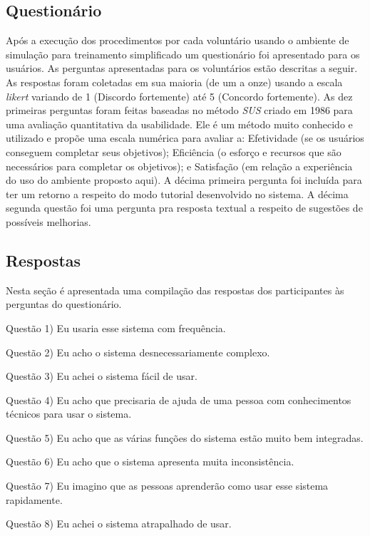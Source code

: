 \subsection{Questionário}
\label{sec:questionarioUsabilidade}

Após a execução dos procedimentos por cada voluntário usando o ambiente de simulação para treinamento simplificado um questionário foi apresentado para os usuários. As perguntas apresentadas para os voluntários estão descritas a seguir. As respostas foram coletadas em sua maioria (de um a onze) usando a escala \textit{likert} \cite{Norman2010} variando de 1 (Discordo fortemente) até 5 (Concordo fortemente). As dez primeiras perguntas foram feitas baseadas no método \textit{\acrfull{SUS}} \cite{Brooke2013} criado em 1986 para uma avaliação quantitativa da usabilidade. Ele é um método muito conhecido e utilizado e propõe uma escala numérica para avaliar a: Efetividade (se os usuários conseguem completar seus objetivos); 
Eficiência (o esforço e recursos que são necessários para completar os objetivos); e
Satisfação (em relação a experiência do uso do ambiente proposto aqui). A décima primeira pergunta foi incluída para ter um retorno a respeito do modo tutorial desenvolvido no sistema. A décima segunda questão foi uma pergunta pra resposta textual a respeito de sugestões de possíveis melhorias.

\subsection{Respostas}
\label{sec:respostasUsabilidade}

Nesta seção é apresentada uma compilação das respostas dos participantes às perguntas do questionário.

Questão 1) Eu usaria esse sistema com frequência.

Questão 2) Eu acho o sistema desnecessariamente complexo.

Questão 3) Eu achei o sistema fácil de usar.

Questão 4) Eu acho que precisaria de ajuda de uma pessoa com conhecimentos técnicos para usar o sistema.

Questão 5) Eu acho que as várias funções do sistema estão muito bem integradas.

Questão 6) Eu acho que o sistema apresenta muita inconsistência.

Questão 7) Eu imagino que as pessoas aprenderão como usar esse sistema rapidamente.

Questão 8) Eu achei o sistema atrapalhado de usar.

